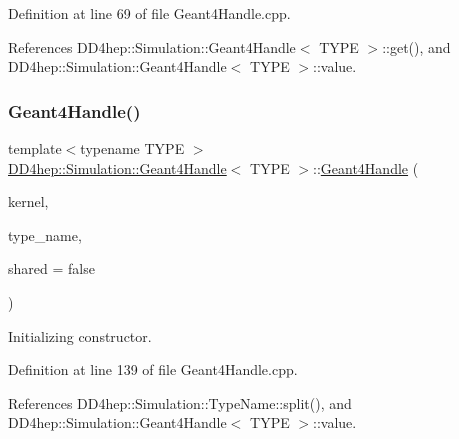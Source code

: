 Definition at line 69 of file Geant4\+Handle.\+cpp.



References D\+D4hep\+::\+Simulation\+::\+Geant4\+Handle$<$ T\+Y\+P\+E $>$\+::get(), and D\+D4hep\+::\+Simulation\+::\+Geant4\+Handle$<$ T\+Y\+P\+E $>$\+::value.

\hypertarget{class_d_d4hep_1_1_simulation_1_1_geant4_handle_a765cd4c227a41d33781599c71fc11e51}{}\label{class_d_d4hep_1_1_simulation_1_1_geant4_handle_a765cd4c227a41d33781599c71fc11e51} 
\subsubsection{\texorpdfstring{Geant4\+Handle()}{Geant4Handle()}\hspace{0.1cm}{\footnotesize\ttfamily [5/20]}}
{\footnotesize\ttfamily template$<$typename T\+Y\+PE $>$ \\
\hyperlink{class_d_d4hep_1_1_simulation_1_1_geant4_handle}{D\+D4hep\+::\+Simulation\+::\+Geant4\+Handle}$<$ T\+Y\+PE $>$\+::\hyperlink{class_d_d4hep_1_1_simulation_1_1_geant4_handle}{Geant4\+Handle} (\begin{DoxyParamCaption}\item[{\hyperlink{class_d_d4hep_1_1_simulation_1_1_geant4_kernel}{Geant4\+Kernel} \&}]{kernel,  }\item[{const char $\ast$}]{type\+\_\+name,  }\item[{bool}]{shared = {\ttfamily false} }\end{DoxyParamCaption})}



Initializing constructor. 



Definition at line 139 of file Geant4\+Handle.\+cpp.



References D\+D4hep\+::\+Simulation\+::\+Type\+Name\+::split(), and D\+D4hep\+::\+Simulation\+::\+Geant4\+Handle$<$ T\+Y\+P\+E $>$\+::value.

\hypertarget{class_d_d4hep_1_1_simulation_1_1_geant4_handle_ae506e6b636fc035905011c9e5a9012ab}{}\label{class_d_d4hep_1_1_simulation_1_1_geant4_handle_ae506e6b636fc035905011c9e5a9012ab} 
